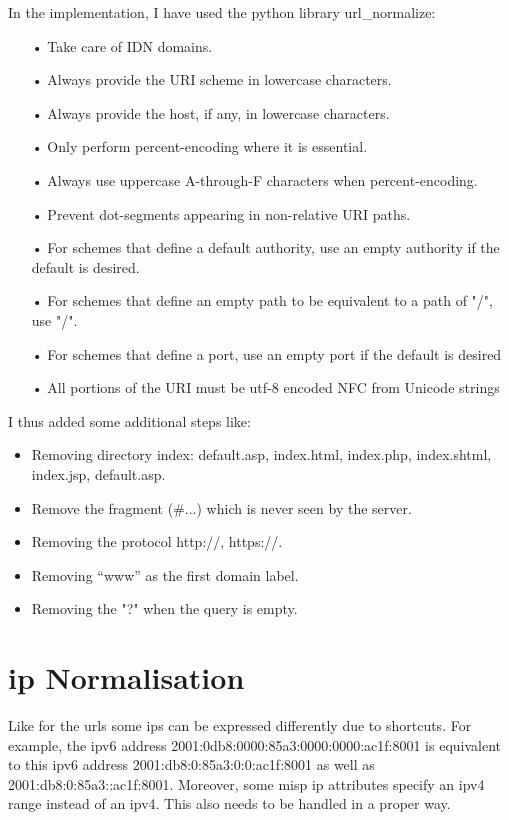 \documentclass{eplmastersthesis}
\begin{document}
In the implementation, I have used the python library url\_normalize:
\begin{itemize}
\item[•] Take care of IDN domains.
\item[•] Always provide the URI scheme in lowercase characters.
\item[•] Always provide the host, if any, in lowercase characters.
\item[•] Only perform percent-encoding where it is essential.
\item[•] Always use uppercase A-through-F characters when percent-encoding.
\item[•] Prevent dot-segments appearing in non-relative URI paths.
\item[•] For schemes that define a default authority, use an empty authority if the default is desired.
\item[•] For schemes that define an empty path to be equivalent to a path of "/", use "/".
\item[•] For schemes that define a port, use an empty port if the default is desired
\item[•] All portions of the URI must be utf-8 encoded NFC from Unicode strings
\end{itemize}

I thus added some additional steps like:
\begin{itemize}
\item Removing directory index: {default.asp, index.html, index.php, index.shtml, index.jsp, default.asp}.
\item Remove the fragment (\#...) which is never seen by the server.
\item Removing the protocol {http://, https://}.
\item Removing  “www” as the first domain label.
\item Removing the "?" when the query is empty.
\end{itemize}

\section{\gls{ip} Normalisation}
\label{sec:IPNorm}
Like for the \glspl{url} some \glspl{ip} can be expressed differently due to shortcuts. For example, the \gls{ipv6} address 2001:0db8:0000:85a3:0000:0000:ac1f:8001 is equivalent to this \gls{ipv6} address 2001:db8:0:85a3:0:0:ac1f:8001 as well as 2001:db8:0:85a3::ac1f:8001.
Moreover, some \gls{misp} \gls{ip} attributes specify an \gls{ipv4} range instead of an \gls{ipv4}. This also needs to be handled in a proper way.\\
\end{document}
